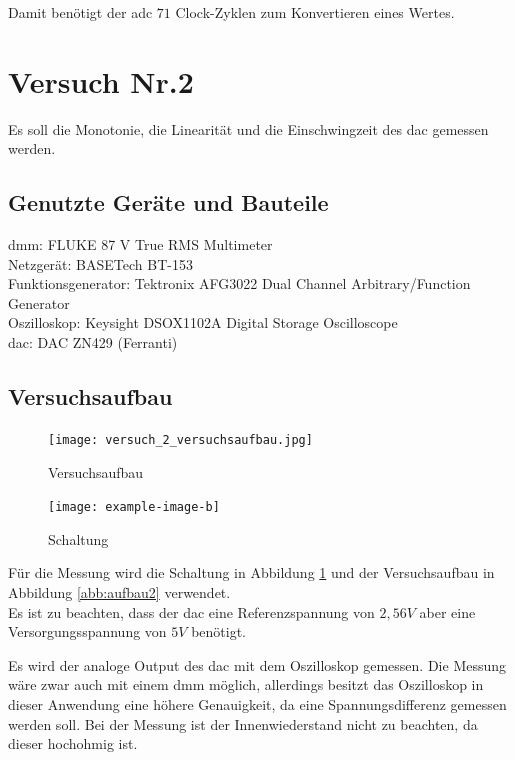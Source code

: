 \documentclass[12pt, a4paper, ngerman]{article}
\begin{document}
Damit benötigt der \ac{adc} $71$ Clock-Zyklen zum Konvertieren eines Wertes.


\section{Versuch Nr.2}

Es soll die Monotonie, die Linearität und die Einschwingzeit des \ac{dac} gemessen werden.

\subsection{Genutzte Geräte und Bauteile}

\acl{dmm}: FLUKE 87 V True RMS Multimeter \\
Netzgerät: BASETech BT-153 \\
Funktionsgenerator: Tektronix AFG3022 Dual Channel Arbitrary/Function Generator \\
Oszilloskop: Keysight DSOX1102A Digital Storage Oscilloscope \\
\ac{dac}: DAC ZN429 (Ferranti)

\subsection{Versuchsaufbau}


\begin{figure}%
  \centering
  \begin{minipage}[b]{0.49\textwidth}
    \texttt{[image: versuch\_2\_versuchsaufbau.jpg]}
    \caption{Versuchsaufbau}
    \label{abb:aufbau2}
  \end{minipage}
  \hfill
  \begin{minipage}[b]{0.49\textwidth}
    \texttt{[image: example-image-b]}
    \caption{Schaltung}
    \label{abb:schaltung2}
  \end{minipage}
\end{figure}

Für die Messung wird die Schaltung in Abbildung \ref{abb:schaltung2}
und der Versuchsaufbau in Abbildung \ref{abb:aufbau2} verwendet. \\
Es ist zu beachten, dass der \ac{dac} eine Referenzspannung von $2,56V$
aber eine Versorgungsspannung von $5V$ benötigt.

Es wird der analoge Output des \ac{dac} mit dem Oszilloskop gemessen.
Die Messung wäre zwar auch mit einem \ac{dmm} möglich,
allerdings besitzt das Oszilloskop in dieser Anwendung eine höhere Genauigkeit, da eine Spannungsdifferenz gemessen werden soll.
Bei der Messung ist der Innenwiederstand nicht zu beachten, da dieser hochohmig ist.
\end{document}
